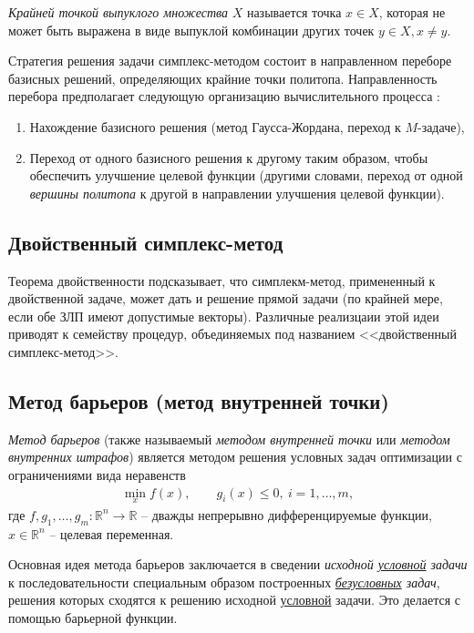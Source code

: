 \documentclass[%
	11pt,
	a4paper,
	utf8,
		]{article}
\begin{document}
\emph{Крайней точкой выпуклого множества} $ X $ называется точка $ x \in X $, которая не может быть выражена в виде выпуклой комбинации других точек $ y \in X, x \neq y $.

Стратегия решения задачи симплекс-методом состоит в направленном переборе базисных решений, определяющих крайние точки политопа. Направленность перебора предполагает следующую организацию вычислительного процесса \cite{panteleev}:
\begin{enumerate}
	\item Нахождение базисного решения (метод Гаусса-Жордана, переход к $ M $-задаче),
	
	\item Переход от одного базисного решения к другому таким образом, чтобы обеспечить улучшение целевой функции (другими словами, переход от одной \emph{вершины политопа} к другой в направлении улучшения целевой функции).
\end{enumerate}

\subsection{Двойственный симплекс-метод}

Теорема двойственности подсказывает, что симплекм-метод, примененный к двойственной задаче, может дать и решение прямой задачи (по крайней мере, если обе ЗЛП имеют допустимые векторы). Различные реализцаии этой идеи приводят к семейству процедур, объединяемых под названием <<двойственный симплекс-метод>>. 

\subsection{Метод барьеров (метод внутренней точки)}

\emph{Метод барьеров} (также называемый \emph{методом внутренней точки} или \emph{методом внутренних штрафов}) является методом решения условных задач оптимизации с ограничениями вида неравенств
\begin{align*}
	\min\limits_x f(x), \qquad g_i(x) \leqslant 0, \ i = 1, \ldots, m,
\end{align*}
где $ f, g_1, \ldots, g_m:\mathbb{R}^n \rightarrow \mathbb{R} $ -- дважды непрерывно дифференцируемые функции, $ x \in \mathbb{R}^n $ -- целевая переменная.

Основная идея метода барьеров заключается в сведении \emph{исходной \underline{условной} задачи} к последовательности специальным образом построенных \emph{\underline{безусловных} задач}, решения которых сходятся к решению исходной \underline{условной} задачи. Это делается с помощью барьерной функции.
\end{document}
